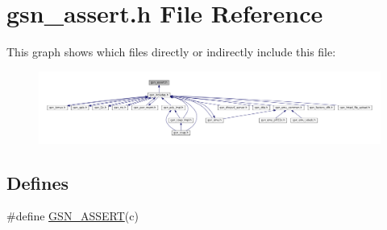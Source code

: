 \hypertarget{a00475}{
\section{gsn\_\-assert.h File Reference}
\label{a00475}
}
This graph shows which files directly or indirectly include this file:
\nopagebreak
\begin{figure}[H]
\begin{center}
\leavevmode
\includegraphics[width=400pt]{a00699}
\end{center}
\end{figure}
\subsection*{Defines}
\begin{DoxyCompactItemize}
\item 
\#define \hyperlink{a00475_a91dbdc304dd61d2fba621535e40d9259}{GSN\_\-ASSERT}(c)
\end{DoxyCompactItemize}


